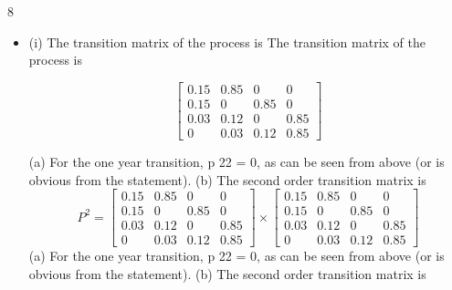 \documentclass[a4paper,12pt]{article}
\begin{document}
8
\begin{itemize}
\item (i)
The transition matrix of the process is
The transition matrix of the process is

\[ \begin{bmatrix}
0.15 & 0.85 & 0 & 0 \\
0.15 & 0 & 0.85 & 0 \\
0.03 & 0.12 & 0 & 0.85 \\
0 & 0.03 & 0.12 & 0.85 
\end{bmatrix}  \]

(a) For the one year transition, p 22 = 0, as can be seen
from above (or is obvious from the statement).
(b) The second order transition matrix is
\[P^2 =  \begin{bmatrix}
0.15 & 0.85 & 0 & 0 \\
0.15 & 0 & 0.85 & 0 \\
0.03 & 0.12 & 0 & 0.85 \\
0 & 0.03 & 0.12 & 0.85 
\end{bmatrix}  \times \begin{bmatrix}
0.15 & 0.85 & 0 & 0 \\
0.15 & 0 & 0.85 & 0 \\
0.03 & 0.12 & 0 & 0.85 \\
0 & 0.03 & 0.12 & 0.85 
\end{bmatrix}  \]
(a) For the one year transition, p 22 = 0, as can be seen
from above (or is obvious from the statement).
(b) The second order transition matrix is


\end{itemize}
\end{document}
